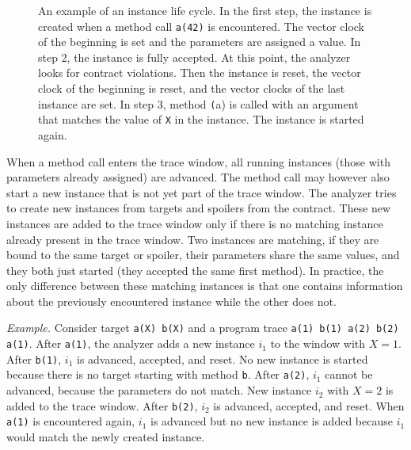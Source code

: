 \begin{figure}[hbt]
    \begin{center}
        \label{instanceLifeCycle}
        
        
        
        
        \caption{An example of an instance life cycle. In the first step, the
        instance is created when a method call \texttt{a(42)} is encountered.
        The vector clock of the beginning is set and the parameters are assigned
        a value. In step 2, the instance is fully accepted. At this point, the
        analyzer looks for contract violations. Then the instance is reset, the
        vector clock of the beginning is reset, and the vector clocks of the
        last instance are set. In step 3, method \texttt(a) is called with an
        argument that matches the value of \texttt{X} in the instance. The
        instance is started again.}
    \end{center}
\end{figure}

When a method call enters the trace window, all running instances (those with
parameters already assigned) are advanced. The method call may however also
start a new instance that is not yet part of the trace window. The analyzer
tries to create new instances from targets and spoilers from the contract. These
new instances are added to the trace window only if there is no matching
instance already present in the trace window. Two instances are matching, if
they are bound to the same target or spoiler, their parameters share the same
values, and they both just started (they accepted the same first method). In
practice, the only difference between these matching instances is that one
contains information about the previously encountered instance while the other
does not.

\emph{Example.} Consider target \texttt{a(X) b(X)} and a program trace
\texttt{a(1) b(1) a(2) b(2) a(1)}. After \texttt{a(1)}, the analyzer adds a new
instance $i_1$ to the window with $X=1$. After \texttt{b(1)}, $i_1$ is advanced,
accepted, and reset. No new instance is started because there is no target
starting with method \texttt{b}. After \texttt{a(2)}, $i_1$ cannot be advanced,
because the parameters do not match. New instance $i_2$ with $X=2$ is added to
the trace window. After \texttt{b(2)}, $i_2$ is advanced, accepted, and reset.
When \texttt{a(1)} is encountered again, $i_1$ is advanced but no new instance
is added because $i_1$ would match the newly created instance.

